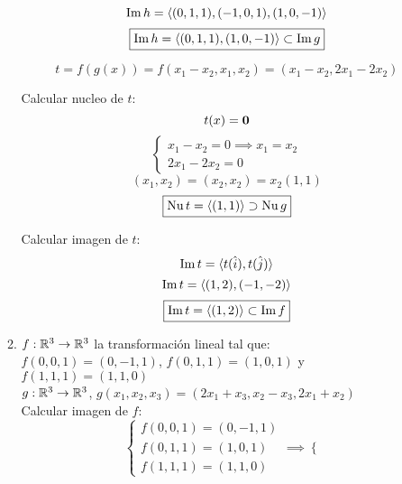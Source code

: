 \documentclass[../practica.root.tex]{subfiles}
\begin{document}
\begin{enumerate}
\begin{enumerate}
\begin{minipage}[t]{0.5\textwidth}
                        \[ \operatorname{Im} h = \langle (0,1,1),(-1,0,1),(1,0,-1) \rangle \]
                        \[ \boxed{\operatorname{Im} h = \langle (0,1,1),(1,0,-1) \rangle \subset \operatorname{Im} g} \]
                    \end{minipage}
                    \[ t = f(g(x)) = f(x_1 - x_2, x_1, x_2) = (x_1 - x_2, 2x_1 - 2x_2) \]
                    \begin{minipage}[t]{0.5\textwidth}
                        Calcular nucleo de \(t\):
                        \[ t(x) = \mathbf{0} \]
                        \[
                            \begin{cases}
                                x_1 - x_2 = 0 \implies x_1 = x_2 \\
                                2x_1 - 2x_2 = 0
                            \end{cases}
                        \] \[
                            (x_1, x_2) = (x_2, x_2) = x_2(1,1)
                        \] \[
                            \boxed{\operatorname{Nu} t = \langle (1,1) \rangle \supset \operatorname{Nu} g}
                        \]
                    \end{minipage}
                    \begin{minipage}[t]{0.5\textwidth}
                        Calcular imagen de \(t\):
                        \[ \operatorname{Im} t = \langle t(\hat{i}),t(\hat{j}) \rangle \]
                        \[ \operatorname{Im} t = \langle (1,2),(-1,-2) \rangle \]
                        \[ \boxed{\operatorname{Im} t = \langle (1,2) \rangle \subset \operatorname{Im} f } \]
                    \end{minipage}
              \item \( f : \mathbb{R}^3 \to \mathbb{R}^3 \) la transformación lineal tal que: \\
                    \( f(0,0,1)=(0,-1,1) \), \( f(0,1,1)=(1,0,1) \) y \( f(1,1,1)=(1,1,0) \) \\
                    \( g : \mathbb{R}^3 \to \mathbb{R}^3 \), \(g(x_1, x_2, x_3) = (2x_1 + x_3, x_2 - x_3, 2x_1 + x_2)\) \\
                    Calcular imagen de \(f\):
                    \[
                        \begin{cases}
                            f(0,0,1) = (0, -1, 1) \\
                            f(0,1,1) = (1,  0, 1) \\
                            f(1,1,1) = (1,  1, 0)
                        \end{cases}
                        \implies
                        \begin{cases}

\end{cases}\]
\end{enumerate}
\end{enumerate}
\end{document}
